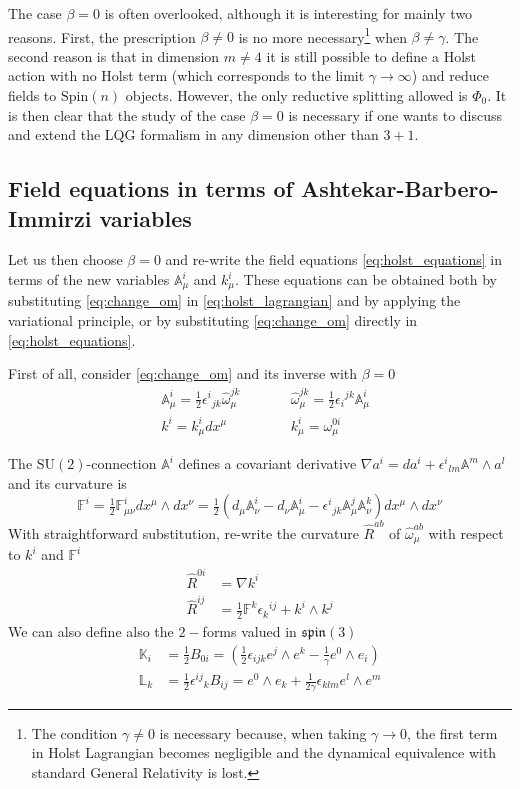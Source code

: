 \documentclass[a4paper, 11pt]{article}
\def\A{\mathbb{A}}
\def\F{\mathbb{F}}
\def\L{\mathbb{L}}
\def\K{\mathbb{K}}
\def\be{\beta}
\def\ga{\gamma}
\def\ep{\epsilon}
\def\om{\omega}
\def\na{\nabla}
\def\we{\wedge}
\def\SU(#1){\mathrm{SU}(#1)}
\def\spin(#1){\mathfrak{spin}(#1)}
\def\Spin(#1){\mathrm{Spin}(#1)}
\let\footnote\thanks}
\numberwithin{equation}{section}
\begin{document}
The case $\be = 0$ is often overlooked, although it is interesting for mainly two reasons. First, the prescription $\be \neq 0$ is no more necessary\footnote{The condition $\gamma \neq 0$ is necessary because, when taking $\ga \to 0$, the first term in Holst Lagrangian becomes negligible and the dynamical equivalence with standard General Relativity is lost.} when $\be \neq \ga$. 
The second reason is that in dimension $m \neq 4$ it is still possible to define a Holst action with no Holst term (which corresponds to the limit $\ga\rightarrow \infty$) and reduce fields to $\Spin(n)$ objects. However, the only reductive splitting allowed is $\Phi_0$. It is then clear that the study of the case $\be = 0$ is necessary if one wants to discuss and extend the LQG formalism in any dimension other than $3+1$.

\subsection{Field equations in terms of Ashtekar-Barbero-Immirzi variables}
Let us then choose $\be = 0$ and re-write the field equations \eqref{eq:holst_equations} in terms of the new variables $\A^i_\mu$ and $k^i_\mu$. These equations can be obtained both by substituting \eqref{eq:change_om} in \eqref{eq:holst_lagrangian} and by applying the variational principle, or by substituting \eqref{eq:change_om} directly in \eqref{eq:holst_equations}.


First of all, consider  \eqref{eq:change_om} and its inverse with $\be = 0$
\begin{equation}
    \begin{aligned}
    &\A^i_\mu = \tfrac 1 2 \ep^i{}_{jk} \hat \om^{jk}_\mu  \qquad && \hat \om^{jk}_\mu = \tfrac 1 2\ep_{i}{}^{jk} \A^i_\mu \\
    & k^i = k^i_\mu dx^\mu && k^i_\mu = \om^{0i}_\mu
    \end{aligned}
    \label{eq:variables_change}
\end{equation}



The $\SU(2)$-connection $\A^i$ defines a covariant derivative $\na a^i = d a^i + \ep^i{}_{lm}\A^m \we a^l$ and its curvature is
\begin{equation}
\F^i = \tfrac 1 2 \F^i_{\mu\nu} dx^\mu \we dx^\nu = \tfrac 1 2 \left(d_\mu \A^i_\nu - d_\nu \A^i_\mu - \ep^i{}_{jk} \A^j_\mu \A^k_\nu\right) dx^\mu \we dx^\nu
\end{equation}
With straightforward substitution, re-write the curvature $\hat R^{ab}$ of $\hat\om^{ab}_\mu$ with respect to $k^i$ and $\F^i$
\begin{align}
    \hat R^{0i} &= \na k^i \\ 
    \hat R^{ij} &= \tfrac 1 2 \F^k\ep_k{}^{ij} + k^i \we k^j
\end{align}
We can also define also the $2-$forms valued in $\spin(3)$
\begin{align}
    \K_i &= \tfrac 1 2 B_{0i} = \left(\tfrac 1 2 \ep_{ijk} e^j \we e^k - \tfrac 1 \ga e^0 \we e_i\right) \\ 
    \L_k &= \tfrac 1 2 \ep^{ij}{}_k B_{ij} = e^0 \we e_k + \tfrac 1 {2\ga}\ep_{klm} e^l \we e^m
\end{align}
\end{document}
